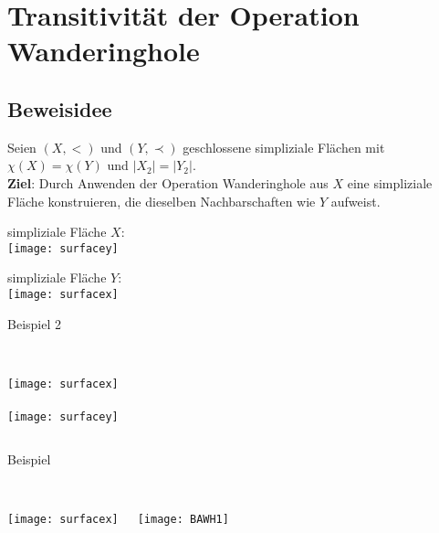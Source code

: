 \documentclass{beamer}
\begin{document}
\section{Transitivität der Operation Wanderinghole}
\subsection{Beweisidee}
\begin{frame}
\end{frame}
\begin{frame}
 Seien $(X,<)$ und $(Y,\prec)$ geschlossene simpliziale Flächen mit $\chi(X)=\chi(Y)$ und $\vert X_2 \vert =\vert Y_2 \vert $.\\\pause
 \textbf{Ziel}: Durch Anwenden der Operation Wanderinghole aus $X$ eine simpliziale Fläche konstruieren, die dieselben Nachbarschaften wie $Y$ aufweist.
\end{frame}
\begin{frame}
simpliziale Fläche $X$:\\
\texttt{[image: surfacey]}
\end{frame}
\begin{frame}
simpliziale Fläche $Y$:\\
\texttt{[image: surfacex]}
\end{frame}
\begin{frame}{Beispiel 2}
\begin{columns}
   \\
    \texttt{[image: surfacex]}\\
 
    \\
    \texttt{[image: surfacey]}
    
\end{columns}
\end{frame}
\begin{frame}{Beispiel}
\begin{columns}
   \\
    \texttt{[image: surfacex]}
 
    \\
    \texttt{[image: BAWH1]}
\end{columns}
\end{frame}
\end{document}
